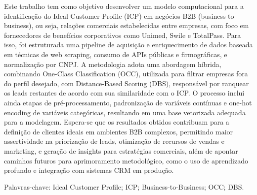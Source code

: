 \documentclass[
        oneside,      %
        english,			
        brazil			 
        ]{abntbibufjf}
\begin{document}
\begin{resumo}

  Este trabalho tem como objetivo desenvolver um modelo computacional para a identificação do Ideal Customer Profile (ICP) em negócios B2B (business-to-business), ou seja, relações comerciais estabelecidas entre empresas, com foco em fornecedores de benefícios corporativos como Unimed, Swile e TotalPass. Para isso, foi estruturada uma pipeline de aquisição e enriquecimento de dados baseada em técnicas de web scraping, consumo de APIs públicas e firmográficas, e normalização por CNPJ. A metodologia adota uma abordagem híbrida, combinando One-Class Classification (OCC), utilizada para filtrar empresas fora do perfil desejado, com Distance-Based Scoring (DBS), responsável por ranquear os leads restantes de acordo com sua similaridade com o ICP. O processo inclui ainda etapas de pré-processamento, padronização de variáveis contínuas e one-hot encoding de variáveis categóricas, resultando em uma base vetorizada adequada para a modelagem. Espera-se que os resultados obtidos contribuam para a definição de clientes ideais em ambientes B2B complexos, permitindo maior assertividade na priorização de leads, otimização de recursos de vendas e marketing, e geração de insights para estratégias comerciais, além de apontar caminhos futuros para aprimoramento metodológico, como o uso de aprendizado profundo e integração com sistemas CRM em produção.

  Palavras-chave: Ideal Customer Profile; ICP; Business-to-Business; OCC; DBS.
  
  \end{resumo}
 
\end{document}
